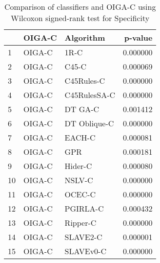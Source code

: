 \begin{table}
\footnotesize
\caption{Comparison of classifiers and OIGA-C using Wilcoxon signed-rank test for Specificity}
\label{tab:OIGA-C wilcoxon Specificity comparison}
\begin{tabular}{lllr}
\hline
 & OIGA-C & Algorithm & p-value \\
\hline
1 & OIGA-C & 1R-C & 0.000000 \\
2 & OIGA-C & C45-C & 0.000069 \\
3 & OIGA-C & C45Rules-C & 0.000000 \\
4 & OIGA-C & C45RulesSA-C & 0.000000 \\
5 & OIGA-C & DT GA-C & 0.001412 \\
6 & OIGA-C & DT Oblique-C & 0.000000 \\
7 & OIGA-C & EACH-C & 0.000081 \\
8 & OIGA-C & GPR & 0.000181 \\
9 & OIGA-C & Hider-C & 0.000080 \\
10 & OIGA-C & NSLV-C & 0.000000 \\
11 & OIGA-C & OCEC-C & 0.000000 \\
12 & OIGA-C & PGIRLA-C & 0.000432 \\
13 & OIGA-C & Ripper-C & 0.000000 \\
14 & OIGA-C & SLAVE2-C & 0.000001 \\
15 & OIGA-C & SLAVEv0-C & 0.000000 \\
\hline
\end{tabular}
\end{table}
